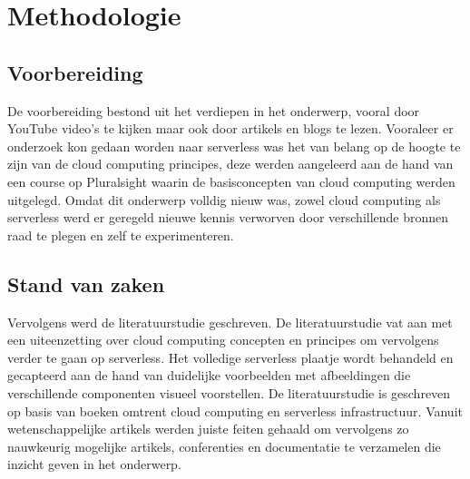 
\chapter{Methodologie}
\label{ch:methodologie}


\section{Voorbereiding}
De voorbereiding bestond uit het verdiepen in het onderwerp, vooral door YouTube video's te kijken maar ook door artikels en blogs te lezen. Vooraleer er onderzoek kon gedaan worden naar serverless was het van belang op de hoogte te zijn van de cloud computing principes, deze werden aangeleerd aan de hand van een course op Pluralsight waarin de basisconcepten van cloud computing werden uitgelegd. Omdat dit onderwerp volldig nieuw was, zowel cloud computing als serverless werd er geregeld nieuwe kennis verworven door verschillende bronnen raad te plegen en zelf te experimenteren.

\section{Stand van zaken}
Vervolgens werd de literatuurstudie geschreven. De literatuurstudie vat aan met een uiteenzetting over cloud computing concepten en principes om vervolgens verder te gaan op serverless. Het volledige serverless plaatje wordt behandeld en gecapteerd aan de hand van duidelijke voorbeelden met afbeeldingen die verschillende componenten visueel voorstellen. De literatuurstudie is geschreven op basis van boeken omtrent cloud computing en serverless infrastructuur. Vanuit wetenschappelijke artikels werden juiste feiten gehaald om vervolgens zo nauwkeurig mogelijke artikels, conferenties en documentatie te verzamelen die inzicht geven in het onderwerp.

